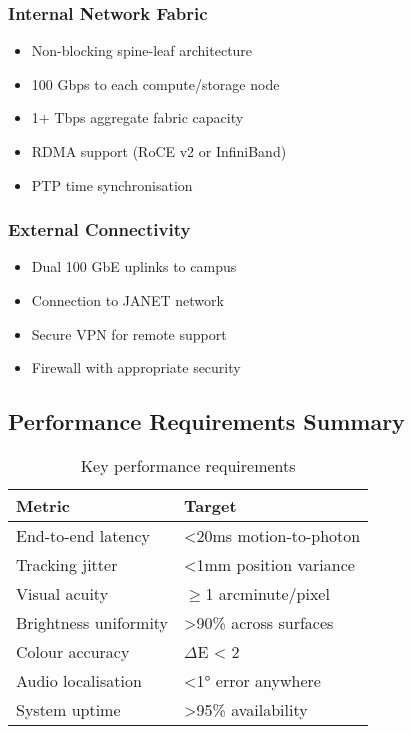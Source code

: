 \subsubsection{Internal Network Fabric}

\begin{itemize}
    \item Non-blocking spine-leaf architecture
    \item 100 Gbps to each compute/storage node
    \item 1+ Tbps aggregate fabric capacity
    \item RDMA support (RoCE v2 or InfiniBand)
    \item PTP time synchronisation
\end{itemize}

\subsubsection{External Connectivity}

\begin{itemize}
    \item Dual 100 GbE uplinks to campus
    \item Connection to JANET network
    \item Secure VPN for remote support
    \item Firewall with appropriate security
\end{itemize}

\subsection{Performance Requirements Summary}

\begin{table}[h]
\centering
\begin{tabular}{|l|l|}
\hline
\textbf{Metric} & \textbf{Target} \\
\hline
End-to-end latency & <20ms motion-to-photon \\
\hline
Tracking jitter & <1mm position variance \\
\hline
Visual acuity & $\geq$1 arcminute/pixel \\
\hline
Brightness uniformity & >90\% across surfaces \\
\hline
Colour accuracy & $\Delta$E < 2 \\
\hline
Audio localisation & <1° error anywhere \\
\hline
System uptime & >95\% availability \\
\hline
\end{tabular}
\caption{Key performance requirements}
\end{table}